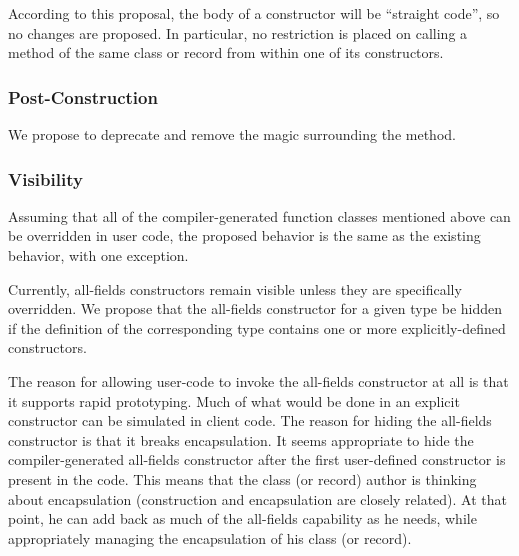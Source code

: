 According to this proposal, the body of a constructor will be ``straight code'', so no
changes are proposed.  In particular, no restriction is placed on calling a method of the
same class or record from within one of its constructors.

\subsubsection{Post-Construction}

We propose to deprecate and remove the magic surrounding the  method.

\subsubsection{Visibility}

Assuming that all of the compiler-generated function classes mentioned above can be
overridden in user code, the proposed behavior is the same as the existing behavior, with
one exception.

Currently, all-fields constructors remain visible unless they are specifically
overridden.  We propose that the all-fields constructor for a given type be hidden if the
definition of the corresponding type contains one or more explicitly-defined constructors.

The reason for allowing user-code to invoke the all-fields constructor at all is that it
supports rapid prototyping.  Much of what would be done in an explicit constructor can be
simulated in client code.  The reason for hiding the all-fields constructor is that it
breaks encapsulation.  It seems appropriate to hide the compiler-generated all-fields
constructor after the first user-defined constructor is present in the code.  This means
that the class (or record) author is thinking about encapsulation (construction and
encapsulation are closely related).  At that point, he can add back as much of the
all-fields capability as he needs, while appropriately managing the encapsulation of his class (or
record).

